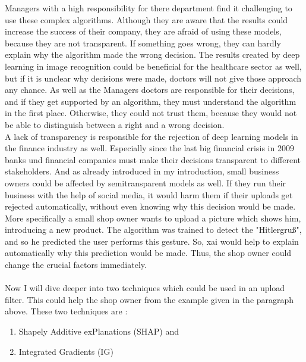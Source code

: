 Managers with a high responsibility for there department find it challenging to use these complex algorithms. Although they are aware that the results could increase the success of their company, they are afraid of using these models, because they are not transparent. If something goes wrong, they can hardly explain why the algorithm made the wrong decision. The results created by deep learning in image recognition could be beneficial for the healthcare sector as well, but if it is unclear why decisions were made, doctors will not give those approach any chance. As well as the Managers doctors are responsible for their decisions, and if they get supported by an algorithm, they must understand the algorithm in the first place. Otherwise, they could not trust them, because they would not be able to distinguish between a right and a wrong decision.\\

A lack of transparency is responsible for the rejection of deep learning models in the finance industry as well. Especially since the last big financial crisis in 2009 banks und financial companies must make their decisions transparent to different stakeholders. And as already introduced in my introduction, small business owners could be affected by semitransparent models as well. If they run their business with the help of social media, it would harm them if their uploads get rejected automatically, without even knowing why this decision would be made.\\

More specifically a small shop owner wants to upload a picture which shows him, introducing a new product. The algorithm was trained to detect the "Hitlergruß", and so he predicted the user performs this gesture. So, \gls{xai} would help to explain automatically why this prediction would be made. Thus, the shop owner could change the crucial factors immediately.\\\\

Now I will dive deeper into two techniques which could be used in an upload filter. This could help the shop owner from the example given in the paragraph above. These two techniques are \cite{Kuang2017}:

\begin{enumerate}
	\item Shapely Additive exPlanations (SHAP) and
	\item Integrated Gradients (IG)
\end{enumerate}

